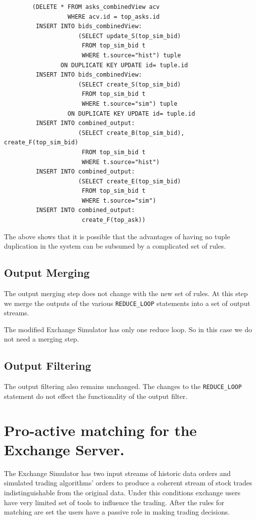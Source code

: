 \documentclass{article}
\begin{document}
\begin{verbatim}
        (DELETE * FROM asks_combinedView acv
                  WHERE acv.id = top_asks.id
         INSERT INTO bids_combinedView: 
                     (SELECT update_S(top_sim_bid)
                      FROM top_sim_bid t
                      WHERE t.source="hist") tuple
                ON DUPLICATE KEY UPDATE id= tuple.id
         INSERT INTO bids_combinedView: 
                     (SELECT create_S(top_sim_bid)
                      FROM top_sim_bid t
                      WHERE t.source="sim") tuple
                  ON DUPLICATE KEY UPDATE id= tuple.id
         INSERT INTO combined_output:
                     (SELECT create_B(top_sim_bid), create_F(top_sim_bid)
                      FROM top_sim_bid t
                      WHERE t.source="hist")
         INSERT INTO combined_output:
                     (SELECT create_E(top_sim_bid)
                      FROM top_sim_bid t
                      WHERE t.source="sim")
         INSERT INTO combined_output:
                      create_F(top_ask))      
\end{verbatim}

\noindent The above shows that it is possible that the advantages of having no tuple duplication in the system can be subsumed by a complicated set of rules.

\subsection{Output Merging}

The output merging step does not change with the new set of rules. At this step we merge the outputs of the various {\tt REDUCE\_LOOP} statements into a set of output streams.

The modified Exchange Simulator has only one reduce loop. So in this case we do not need a merging step.

\subsection{Output Filtering}

The output filtering also remains unchanged. The changes to the {\tt REDUCE\_LOOP} statement do not effect the functionality of the output filter.  

\section{Pro-active matching for the Exchange Server.}

The Exchange Simulator has two input streams of historic data orders and simulated trading algorithms' orders to produce a coherent stream of stock trades indistinguishable from the original data. Under this conditions exchange users have very limited set of tools to influence the trading. After the rules for matching are set the users have a passive role in making trading decisions. 
\end{document}
